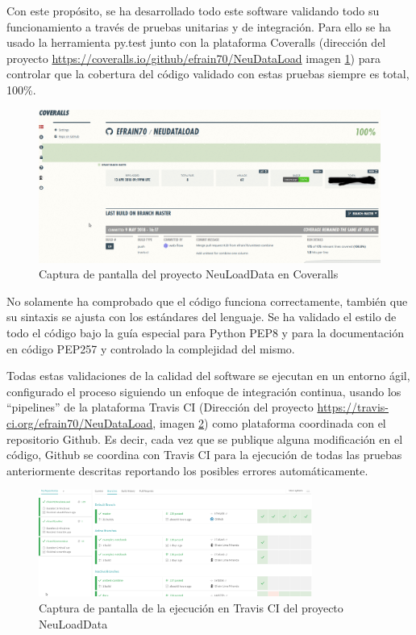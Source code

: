 Con este propósito, se ha desarrollado todo este software validando todo su funcionamiento a través de pruebas unitarias y de integración. Para ello se ha usado la herramienta py.test \cite{Pytest:Documentation} junto con la plataforma Coveralls \cite{CoverallsStatistics} (dirección del proyecto \url{https://coveralls.io/github/efrain70/NeuDataLoad} imagen \ref{figure:coveralls}) para controlar que la cobertura del código validado con estas pruebas siempre es total, 100\%.

\begin{figure}[H]
\centering
\includegraphics[width=1\textwidth]{figs/software/HFRiU5.png}
\caption{Captura de pantalla del proyecto NeuLoadData en Coveralls}
\label{figure:coveralls}
\end{figure}

No solamente ha comprobado que el código funciona correctamente, también que su sintaxis se ajusta con los estándares del lenguaje. Se ha validado el estilo de todo el código bajo la guía especial para Python PEP8 \cite{PEPPython.orgb} y para la documentación en código PEP257 \cite{PEPPython.org} y controlado la complejidad del mismo.

Todas estas validaciones de la calidad del software se ejecutan en un entorno ágil, configurado el proceso siguiendo un enfoque de integración continua, usando los ``pipelines'' de la plataforma Travis CI \cite{TravisConfidence} (Dirección del proyecto \url{https://travis-ci.org/efrain70/NeuDataLoad}, imagen \ref{figure:travis}) como plataforma coordinada con el repositorio Github. Es decir, cada vez que se publique alguna modificación en el código, Github se coordina con Travis CI para la ejecución de todas las pruebas anteriormente descritas reportando los posibles errores automáticamente.

\begin{figure}[H]
\centering
\includegraphics[width=0.8\textwidth]{figs/software/travis.png}
\caption{Captura de pantalla de la ejecución en Travis CI del proyecto NeuLoadData}
\label{figure:travis}
\end{figure}

